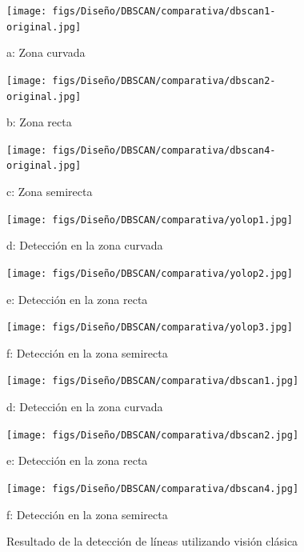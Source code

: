 \begin{figure}[H]
  \centering
  \begin{minipage}[t]{0.3\textwidth}
      \centering
      \texttt{[image: figs/Diseño/DBSCAN/comparativa/dbscan1-original.jpg]}
      \caption*{a: Zona curvada}
  \end{minipage}
  \hfill
  \begin{minipage}[t]{0.3\textwidth}
      \centering
      \texttt{[image: figs/Diseño/DBSCAN/comparativa/dbscan2-original.jpg]}
      \caption*{b: Zona recta}
  \end{minipage}
  \hfill
  \begin{minipage}[t]{0.3\textwidth}
      \centering
      \texttt{[image: figs/Diseño/DBSCAN/comparativa/dbscan4-original.jpg]}
      \caption*{c: Zona semirecta}
  \end{minipage}
  
  \vspace{1cm}
  
  \begin{minipage}[t]{0.3\textwidth}
      \centering
      \texttt{[image: figs/Diseño/DBSCAN/comparativa/yolop1.jpg]}
      \caption*{d: Detección en la zona curvada}
  \end{minipage}
  \hfill
  \begin{minipage}[t]{0.3\textwidth}
      \centering
      \texttt{[image: figs/Diseño/DBSCAN/comparativa/yolop2.jpg]}
      \caption*{e: Detección en la zona recta}
  \end{minipage}
  \hfill
  \begin{minipage}[t]{0.3\textwidth}
      \centering
      \texttt{[image: figs/Diseño/DBSCAN/comparativa/yolop3.jpg]}
      \caption*{f: Detección en la zona semirecta}
  \end{minipage}

  \vspace{1cm}
  
  \begin{minipage}[t]{0.3\textwidth}
      \centering
      \texttt{[image: figs/Diseño/DBSCAN/comparativa/dbscan1.jpg]}
      \caption*{d: Detección en la zona curvada}
  \end{minipage}
  \hfill
  \begin{minipage}[t]{0.3\textwidth}
      \centering
      \texttt{[image: figs/Diseño/DBSCAN/comparativa/dbscan2.jpg]}
      \caption*{e: Detección en la zona recta}
  \end{minipage}
  \hfill
  \begin{minipage}[t]{0.3\textwidth}
      \centering
      \texttt{[image: figs/Diseño/DBSCAN/comparativa/dbscan4.jpg]}
      \caption*{f: Detección en la zona semirecta}
  \end{minipage}
  \caption{Resultado de la detección de líneas utilizando visión clásica}
  \label{Vision_clasica}
\end{figure}



